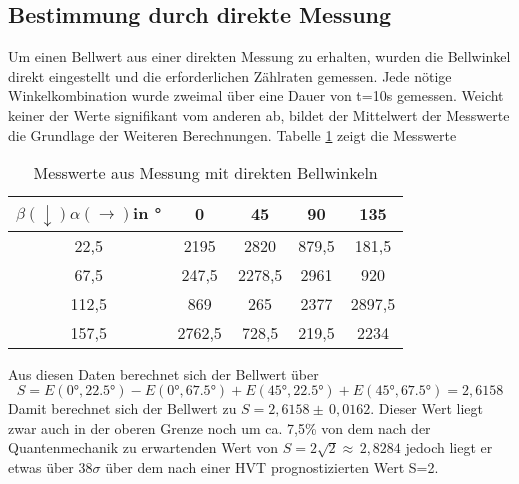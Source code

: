 \documentclass[twoside,colorback,accentcolor=tud4c,11pt]{tudreport}
\begin{document}
\subsection{Bestimmung durch direkte Messung}
Um einen Bellwert aus einer direkten Messung zu erhalten, wurden die Bellwinkel direkt eingestellt und die erforderlichen Zählraten gemessen. Jede nötige Winkelkombination wurde zweimal über eine Dauer von t=10s gemessen. Weicht keiner der Werte signifikant vom anderen ab, bildet der Mittelwert der Messwerte die Grundlage der Weiteren Berechnungen. Tabelle \ref{bellwerte} zeigt die Messwerte
\begin{table}[H]
\renewcommand*{\arraystretch}{1.2}
\centering
\begin{tabular}{|c|c|c|c|c|}
\hline 
$\beta(\downarrow)\alpha(\rightarrow)$in ° & 0 & 45 & 90 & 135 \\ 
\hline 
22,5 & 2195 & 2820 & 879,5 & 181,5 \\ 
\hline 
67,5 & 247,5 & 2278,5 & 2961 & 920 \\ 
\hline 
112,5 & 869 & 265 & 2377 & 2897,5 \\ 
\hline 
157,5 & 2762,5 & 728,5 & 219,5 & 2234 \\ 
\hline 
\end{tabular} 
\caption{Messwerte aus Messung mit direkten Bellwinkeln}\label{bellwerte}
\end{table}
Aus diesen Daten berechnet sich der Bellwert über 
\begin{equation}
S=E(0°,22.5°)-E(0°,67.5°)+E(45°,22.5°)+E(45°,67.5°)=2,6158
\end{equation}
Damit berechnet sich der Bellwert zu $S=2,6158\pm\,0,0162$. Dieser Wert liegt zwar auch in der oberen Grenze noch um ca. 7,5\% von dem nach der Quantenmechanik zu erwartenden Wert von $S=2\sqrt{2}\approx\,2,8284$ jedoch liegt er etwas über $38\sigma$ über dem nach einer HVT prognostizierten Wert S=2.
\end{document}

